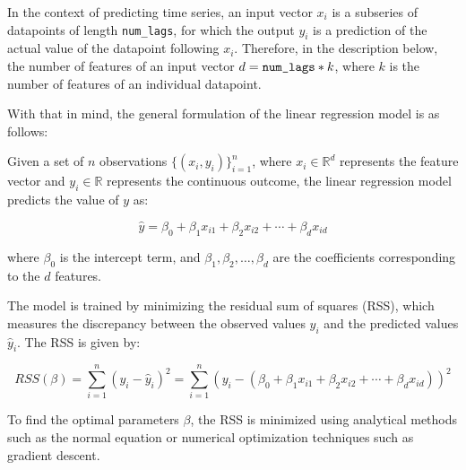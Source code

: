 In the context of predicting time series, an input vector \(x_i\) is a subseries of datapoints of length \verb|num_lags|, for which the output \(y_i\) is a prediction of the actual value of the datapoint following \(x_i\). Therefore, in the description below, the number of features of an input vector \(d = \verb|num_lags|*k\), where \(k\) is the number of features of an individual datapoint.

With that in mind, the general formulation of the linear regression model is as follows:

Given a set of \(n\) observations \(\{(x_i, y_i)\}_{i=1}^n\), where \(x_i \in \mathbb{R}^d\) represents the feature vector and \(y_i \in \mathbb{R}\) represents the continuous outcome, the linear regression model predicts the value of \(y\) as:

\[
	\hat{y} = \beta_0 + \beta_1 x_{i1} + \beta_2 x_{i2} + \cdots + \beta_d x_{id}
\]

where \(\beta_0\) is the intercept term, and \(\beta_1, \beta_2, \ldots, \beta_d\) are the coefficients corresponding to the \(d\) features.

The model is trained by minimizing the residual sum of squares (RSS), which measures the discrepancy between the observed values \(y_i\) and the predicted values \(\hat{y}_i\). The RSS is given by:

\[
	RSS(\beta) = \sum_{i=1}^n (y_i - \hat{y}_i)^2 = \sum_{i=1}^n \left(y_i - (\beta_0 + \beta_1 x_{i1} + \beta_2 x_{i2} + \cdots + \beta_d x_{id})\right)^2
\]

To find the optimal parameters \(\beta\), the RSS is minimized using analytical methods such as the normal equation or numerical optimization techniques such as gradient descent.









